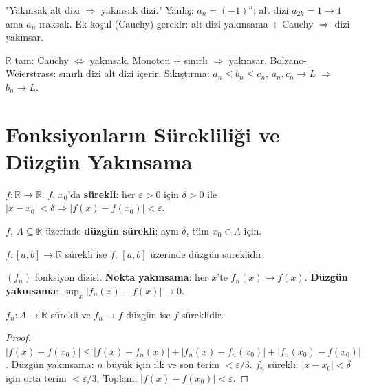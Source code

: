 \begin{hataanalizi}
"Yakınsak alt dizi $\Rightarrow$ yakınsak dizi."
Yanlış: $a_n = (-1)^n$; alt dizi $a_{2k} = 1 \to 1$ ama $a_n$ ıraksak.
Ek koşul (Cauchy) gerekir: alt dizi yakınsama + Cauchy $\Rightarrow$ dizi yakınsar.
\end{hataanalizi}

\begin{mikroozet}
$\mathbb{R}$ tam: Cauchy $\Leftrightarrow$ yakınsak.
Monoton + sınırlı $\Rightarrow$ yakınsar.
Bolzano-Weierstrass: sınırlı dizi alt dizi içerir.
Sıkıştırma: $a_n \leq b_n \leq c_n$, $a_n,c_n \to L$ $\Rightarrow$ $b_n \to L$.
\end{mikroozet}

\section{Fonksiyonların Sürekliliği ve Düzgün Yakınsama}
\label{sec:sureklilik_yakinsama}

\begin{tanim}
$f : \mathbb{R} \to \mathbb{R}$. $f$, $x_0$'da \textbf{sürekli}: her $\varepsilon > 0$ için
$\delta > 0$ ile $|x - x_0| < \delta \Rightarrow |f(x) - f(x_0)| < \varepsilon$.

$f$, $A \subseteq \mathbb{R}$ üzerinde \textbf{düzgün sürekli}: aynı $\delta$, tüm $x_0 \in A$ için.
\end{tanim}

\begin{teorem}
\label{thm:heine_cantor}
$f : [a,b] \to \mathbb{R}$ sürekli ise $f$, $[a,b]$ üzerinde düzgün süreklidir.
\end{teorem}

\begin{tanim}
$(f_n)$ fonksiyon dizisi.
\textbf{Nokta yakınsama}: her $x$'te $f_n(x) \to f(x)$.
\textbf{Düzgün yakınsama}: $\sup_x |f_n(x) - f(x)| \to 0$.
\end{tanim}

\begin{teorem}
\label{thm:duzgun_yaklinsama}
$f_n : A \to \mathbb{R}$ sürekli ve $f_n \to f$ düzgün ise $f$ süreklidir.
\end{teorem}

\begin{proof}
$|f(x) - f(x_0)| \leq |f(x) - f_n(x)| + |f_n(x) - f_n(x_0)| + |f_n(x_0) - f(x_0)|$.
Düzgün yakınsama: $n$ büyük için ilk ve son terim $< \varepsilon/3$.
$f_n$ sürekli: $|x-x_0| < \delta$ için orta terim $< \varepsilon/3$.
Toplam: $|f(x)-f(x_0)| < \varepsilon$.
\end{proof}

